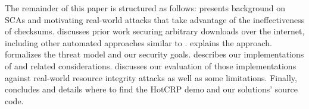 The remainder of this paper is structured as follows: 
presents background on SCAs and motivating real-world attacks that take
advantage of the ineffectiveness of checksums.  discusses prior
work securing arbitrary downloads over the internet, including other automated
approaches similar to \SYSTEM{}.  explains the \SYSTEM{}
approach.  formalizes the threat model and our security goals.
 describes our implementations of \SYSTEM{} and related
considerations.  discusses our evaluation of those
implementations against real-world resource integrity attacks as well as some
limitations. Finally,  concludes and 
details where to find the HotCRP demo and our solutions' source code.
